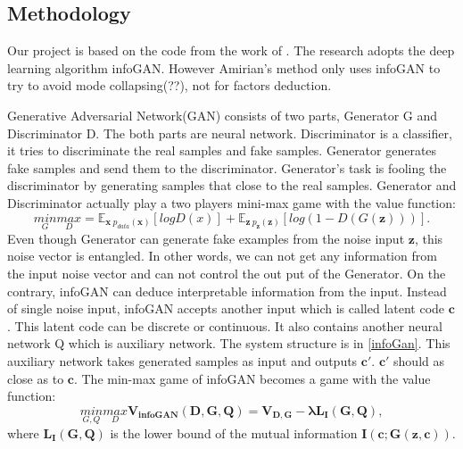 
\subsection*{Methodology}
Our project is based on the code from the work of \cite{Amirian_2019_CVPR_Workshops}. The research adopts the deep learning algorithm infoGAN. However Amirian's method only uses infoGAN to try to avoid mode collapsing(??), not for factors deduction.

Generative Adversarial Network(GAN) consists of two parts, Generator G and Discriminator D. The both parts are neural network. Discriminator is a classifier, it tries to discriminate the real samples and fake samples. Generator generates fake samples and send them to the discriminator. Generator's task is fooling the discriminator by generating samples that close to the real samples. Generator and Discriminator actually play a two players mini-max game with the value function\cite{goodfellow2014generative}:
\[\underset{G}{min}\underset{D}{max} = \mathbb{E}_{\mathbf{x}~p_{data}(\mathbf{x})}[logD(x)] + \mathbb{E}_{\mathbf{z}~p_{\mathbf{z}}(\mathbf{z})}[log(1 - D(G(\mathbf{z})))].\] Even though Generator can generate fake examples from the noise input \(\mathbf{z}\), this noise vector is entangled. In other words, we can not get any information from the input noise vector and can not control the out put of the Generator. On the contrary, infoGAN can deduce interpretable information from the input. Instead of single noise input, infoGAN accepts another input which is called latent code \(\mathbf{c}\). This latent code can be discrete or continuous. It also contains another neural network Q which is auxiliary network. The system structure is in \ref{infoGan}. This auxiliary network takes generated samples as input and outputs \(\mathbf{c'}\). \(\mathbf{c'}\)  should as close as to \( \mathbf{c}\). The min-max game of infoGAN becomes a game with the value function\cite{infogan}:
\[\underset{G,Q}{min}\underset{D}{max} \mathbf{V_{infoGAN}(D, G, Q)} = \mathbf{V_{D, G} - \lambda \mathbf{L_I(G,Q)}},\] where \(\mathbf{L_I(G,Q)}\) is the lower bound of the mutual information \(\mathbf{I(c;G(z,c))}\).
